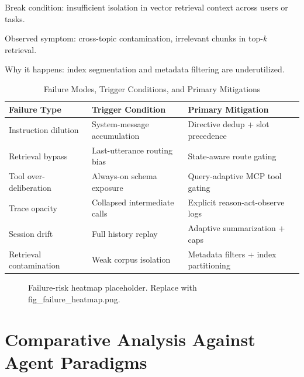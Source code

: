 \documentclass[conference]{IEEEtran}
\begin{document}
Break condition:
insufficient isolation in vector retrieval context across users or tasks.

Observed symptom:
cross-topic contamination,
irrelevant chunks in top-$k$ retrieval.

Why it happens:
index segmentation and metadata filtering are underutilized.

\begin{table}[H]
\caption{Failure Modes, Trigger Conditions, and Primary Mitigations}
\label{tab:failure_matrix}
\centering
\begin{tabular}{p{1.9cm}p{2.0cm}p{2.1cm}}
\toprule
Failure Type & Trigger Condition & Primary Mitigation \\
\midrule
Instruction dilution & System-message accumulation & Directive dedup + slot precedence \\
Retrieval bypass & Last-utterance routing bias & State-aware route gating \\
Tool over-deliberation & Always-on schema exposure & Query-adaptive MCP tool gating \\
Trace opacity & Collapsed intermediate calls & Explicit reason-act-observe logs \\
Session drift & Full history replay & Adaptive summarization + caps \\
Retrieval contamination & Weak corpus isolation & Metadata filters + index partitioning \\
\bottomrule
\end{tabular}
\end{table}

\begin{figure}[H]
\centering
{}
\caption{Failure-risk heatmap placeholder. Replace with fig\_failure\_heatmap.png.}
\label{fig:failure_heatmap}
\end{figure}

\section{Comparative Analysis Against Agent Paradigms}
\label{sec:comparative}
\end{document}

